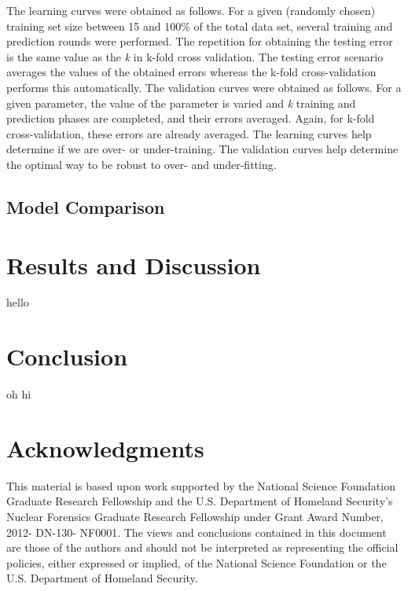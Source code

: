 \documentclass{anstrans}
\begin{document}
The learning curves were obtained as follows. For a given (randomly chosen)
training set size between 15 and 100\% of the total data set, several training
and prediction rounds were performed. The repetition for obtaining the testing
error is the same value as the \textit{k} in k-fold cross validation. The
testing error scenario averages the values of the obtained errors whereas the
k-fold cross-validation performs this automatically.  The validation curves
were obtained as follows. For a given parameter, the value of the parameter is
varied and \textit{k} training and prediction phases are completed, and their
errors averaged. Again, for k-fold cross-validation, these errors are already
averaged. The learning curves help determine if we are over- or under-training.
The validation curves help determine the optimal way to be robust to over- and
under-fitting. 

\subsection{Model Comparison}

\section{Results and Discussion}
hello

\section{Conclusion}
oh hi

\section{Acknowledgments} This material is based upon work supported by the
National Science Foundation Graduate Research Fellowship and the U.S.
Department of Homeland Security's Nuclear Forensics Graduate Research
Fellowship under Grant Award Number, 2012- DN-130- NF0001. The views and
conclusions contained in this document are those of the authors and should not
be interpreted as representing the official policies, either expressed or
implied, of the National Science Foundation or the U.S. Department of Homeland
Security.



\end{document}
